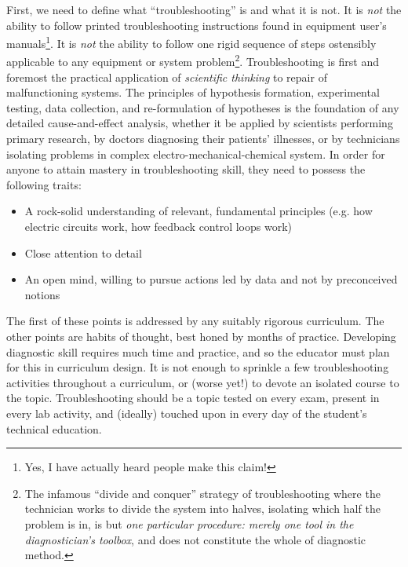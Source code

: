 First, we need to define what ``troubleshooting'' is and what it is not.  It is \textit{ not} the ability to follow printed troubleshooting instructions found in equipment user's manuals\footnote{Yes, I have actually heard people make this claim!}.  It is \textit{ not} the ability to follow one rigid sequence of steps ostensibly applicable to any equipment or system problem\footnote{The infamous ``divide and conquer'' strategy of troubleshooting where the technician works to divide the system into halves, isolating which half the problem is in, is but \textit{ one particular procedure: merely one tool in the diagnostician's toolbox}, and does not constitute the whole of diagnostic method.}.  Troubleshooting is first and foremost the practical application of \textit{scientific thinking} to repair of malfunctioning systems.  The principles of hypothesis formation, experimental testing, data collection, and re-formulation of hypotheses is the foundation of any detailed cause-and-effect analysis, whether it be applied by scientists performing primary research, by doctors diagnosing their patients' illnesses, or by technicians isolating problems in complex electro-mechanical-chemical system.  In order for anyone to attain mastery in troubleshooting skill, they need to possess the following traits:

\begin{itemize}
\item  A rock-solid understanding of relevant, fundamental principles (e.g. how electric circuits work, how feedback control loops work)
\item  Close attention to detail
\item  An open mind, willing to pursue actions led by data and not by preconceived notions
\end{itemize}

The first of these points is addressed by any suitably rigorous curriculum.  The other points are habits of thought, best honed by months of practice.  Developing diagnostic skill requires much time and practice, and so the educator must plan for this in curriculum design.  It is not enough to sprinkle a few troubleshooting activities throughout a curriculum, or (worse yet!) to devote an isolated course to the topic.  Troubleshooting should be a topic tested on every exam, present in every lab activity, and (ideally) touched upon in every day of the student's technical education.

